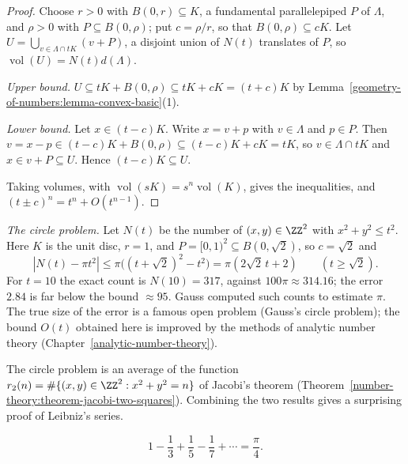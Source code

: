 \begin{proof}
Choose $r > 0$ with $B(0, r) \subseteq K$, a fundamental parallelepiped $P$ of $\Lambda$, and $\rho > 0$ with $P \subseteq B(0, \rho)$; put $c = \rho/r$, so that $B(0, \rho) \subseteq cK$. Let
$U = \bigcup_{v \in \Lambda \cap tK}(v + P)$, a disjoint union of $N(t)$ translates of $P$, so $\operatorname{vol}(U) = N(t)d(\Lambda)$.

\emph{Upper bound.} $U \subseteq tK + B(0, \rho) \subseteq tK + cK = (t + c)K$ by Lemma~\ref{geometry-of-numbers:lemma-convex-basic}(1).

\emph{Lower bound.} Let $x \in (t - c)K$. Write $x = v + p$ with $v \in \Lambda$ and $p \in P$. Then $v = x - p \in (t - c)K + B(0, \rho) \subseteq (t - c)K + cK = tK$, so $v \in \Lambda \cap tK$ and
$x \in v + P \subseteq U$. Hence $(t - c)K \subseteq U$.

Taking volumes, with $\operatorname{vol}(sK) = s^n\operatorname{vol}(K)$, gives the inequalities, and $(t \pm c)^n = t^n + O(t^{n-1})$.
\end{proof}

\begin{example}\label{geometry-of-numbers:example-gauss-circle}
\emph{The circle problem.} Let $N(t)$ be the number of $(x, y) \in \ZZ^2$ with $x^2 + y^2 \leq t^2$. Here $K$ is the unit disc, $r = 1$, and $P = [0, 1)^2 \subseteq B(0, \sqrt2)$, so $c = \sqrt2$ and
\[
|N(t) - \pi t^2| \leq \pi\bigl((t + \sqrt2)^2 - t^2\bigr) = \pi(2\sqrt2\,t + 2) \qquad (t \geq \sqrt2).
\]
For $t = 10$ the exact count is $N(10) = 317$, against $100\pi \approx 314.16$; the error $2.84$ is far below the bound $\approx 95$. Gauss computed such counts to estimate $\pi$. The true size of the
error is a famous open problem (Gauss's circle problem); the bound $O(t)$ obtained here is improved by the methods of analytic number theory (Chapter~\ref{analytic-number-theory}).
\end{example}

The circle problem is an average of the function $r_2(n) = \#\{(x, y) \in \ZZ^2 : x^2 + y^2 = n\}$ of Jacobi's theorem (Theorem~\ref{number-theory:theorem-jacobi-two-squares}). Combining the two
results gives a surprising proof of Leibniz's series.

\begin{proposition}\label{geometry-of-numbers:proposition-leibniz}
\[
1 - \frac13 + \frac15 - \frac17 + \cdots = \frac{\pi}{4}.
\]
\end{proposition}


